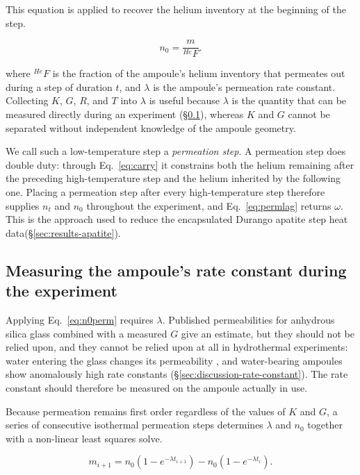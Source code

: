 This equation is applied to recover the helium inventory at the beginning of the step.

\begin{equation}
\label{eq:n0perm}
n_{0} = \frac{m}{^{He}F} .
\end{equation}

where $^{He}F$ is the fraction of the ampoule's helium inventory that permeates out during a step of duration $t$, and $\lambda$ is the ampoule's permeation rate constant. Collecting $K$, $G$, $R$, and $T$ into $\lambda$ is useful because $\lambda$ is the quantity that can be measured directly during an experiment (\S\ref{sec:rate-constant}), whereas $K$ and $G$ cannot be separated without independent knowledge of the ampoule geometry.
 
We call such a low-temperature step a \emph{permeation step}. A permeation step does double duty: through Eq.~\eqref{eq:carry} it constrains both the helium remaining after the preceding high-temperature step and the helium inherited by the following one. Placing a permeation step after every high-temperature step therefore supplies $n_{t}$ and $n_{0}$ throughout the experiment, and Eq.~\eqref{eq:permlag} returns $\omega$. This is the approach used to reduce the encapsulated Durango apatite step heat data(\S\ref{sec:results-apatite}).

\subsection{Measuring the ampoule's rate constant during the experiment}\label{sec:rate-constant}

Applying Eq.~\eqref{eq:n0perm} requires $\lambda$. Published permeabilities for anhydrous silica glass \citep{norton1953,altemose1961,swets1961,masaryk1968} combined with a measured $G$ give an estimate, but they should not be relied upon, and they cannot be relied upon at all in hydrothermal experiments: water entering the glass changes its permeability \citep{shelby1972,tsuru2011}, and water-bearing ampoules show anomalously high rate constants (\S\ref{sec:discussion-rate-constant}). The rate constant should therefore be measured on the ampoule actually in use.

Because permeation remains first order regardless of the values of $K$ and $G$, a series of consecutive isothermal permeation steps determines $\lambda$ and $n_{0}$ together with a non-linear least squares solve.

\begin{equation}
\label{eq:incyield}
m_{i+1} = n_{0}\left(1 - e^{-\lambda t_{i+1}}\right) - n_{0}\left(1 - e^{-\lambda t_{i}}\right) .
\end{equation}

